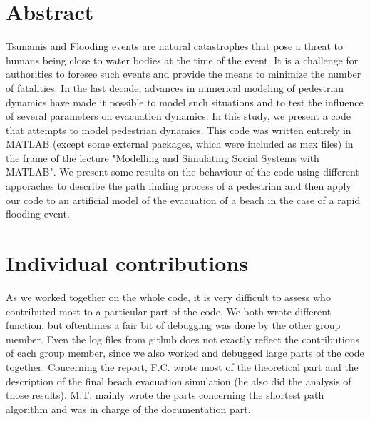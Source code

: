 \documentclass[11pt]{article}
\begin{document}
\tableofcontents

\newpage




\section{Abstract}
Tsunamis and Flooding events are natural catastrophes that pose a threat to humans being close to water bodies at the time of the event. It is a challenge for authorities to foresee such events and provide the means to minimize the number of fatalities. In the last decade, advances in numerical modeling of pedestrian dynamics have made it possible to model such situations and to test the influence of several parameters on evacuation dynamics. In this study, we present a code that attempts to model pedestrian dynamics. This code was written entirely in MATLAB (except some external packages, which were included as mex files) in the frame of the lecture "Modelling and Simulating Social Systems with MATLAB". We present some results on the behaviour of the code using different apporaches to describe the path finding process of a pedestrian and then apply our code to an artificial model of the evacuation of a beach in the case of a rapid flooding event.

\section{Individual contributions}
As we worked together on the whole code, it is very difficult to assess who contributed most to a particular part of the code. We both wrote different function, but oftentimes a fair bit of debugging was done by the other group member. Even the log files from github does not exactly reflect the contributions of each group member, since we also worked and debugged large parts of the code together. Concerning the report, F.C. wrote most of the theoretical part and the description of the final beach evacuation simulation (he also did the analysis of those results). M.T. mainly wrote the parts concerning the shortest path algorithm and was in charge of the documentation part.  
\end{document}
